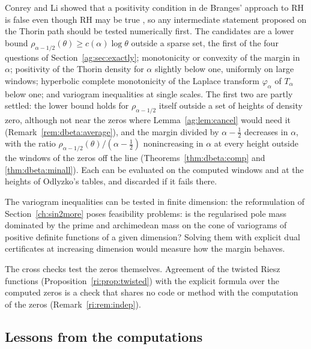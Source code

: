 Conrey and Li showed that a positivity condition in de Branges' approach to RH is false even though RH may be true \cite{CL00}, so any intermediate statement proposed on the Thorin path should be tested numerically first. The candidates are a lower bound $\rho_{\alpha-1/2}(\theta)\ge c(\alpha)\log\theta$ outside a sparse set, the first of the four questions of Section~\ref{ag:sec:exactly}; monotonicity or convexity of the margin in $\alpha$; positivity of the Thorin density for $\alpha$ slightly below one, uniformly on large windows; hyperbolic complete monotonicity of the Laplace transform $\varphi_\alpha$ of $T_\alpha$ below one; and variogram inequalities at single scales. The first two are partly settled: the lower bound holds for $\rho_{\alpha-1/2}$ itself outside a set of heights of density zero, although not near the zeros where Lemma~\ref{ag:lem:cancel} would need it (Remark~\ref{rem:dbeta:average}), and the margin divided by $\alpha-\frac12$ decreases in $\alpha$, with the ratio $\rho_{\alpha-1/2}(\theta)/(\alpha-\frac12)$ nonincreasing in $\alpha$ at every height outside the windows of the zeros off the line (Theorems~\ref{thm:dbeta:comp} and \ref{thm:dbeta:minall}). Each can be evaluated on the computed windows and at the heights of Odlyzko's tables, and discarded if it fails there.

The variogram inequalities can be tested in finite dimension: the reformulation of Section~\ref{ch:sin2more} poses feasibility problems: is the regularised pole mass dominated by the prime and archimedean mass on the cone of variograms of positive definite functions of a given dimension? Solving them with explicit dual certificates at increasing dimension would measure how the margin behaves.

The cross checks test the zeros themselves. Agreement of the twisted Riesz functions (Proposition~\ref{ri:prop:twisted}) with the explicit formula over the computed zeros is a check that shares no code or method with the computation of the zeros (Remark~\ref{ri:rem:indep}).

\subsection{Lessons from the computations}\label{ch:lessons}

